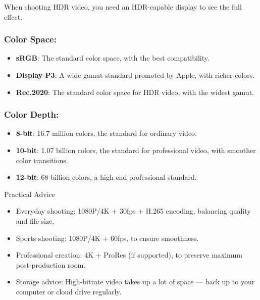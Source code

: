 When shooting HDR video, you need an HDR-capable display to see the full effect.


\subsubsection*{Color Space:}

\begin{itemize}
  \item \textbf{sRGB}: The standard color space, with the best compatibility.
  \item \textbf{Display P3}: A wide-gamut standard promoted by Apple, with richer colors.
  \item \textbf{Rec.2020}: The standard color space for HDR video, with the widest gamut.
\end{itemize}

\subsubsection*{Color Depth:}

\begin{itemize}
  \item \textbf{8-bit}: 16.7 million colors, the standard for ordinary video.
  \item \textbf{10-bit}: 1.07 billion colors, the standard for professional video, with smoother color transitions.
  \item \textbf{12-bit}: 68 billion colors, a high-end professional standard.
\end{itemize}

\begin{tcbinfo}{Practical Advice}
\begin{itemize}
  \item Everyday shooting: 1080P/4K + 30fps + H.265 encoding, balancing quality and file size.
  \item Sports shooting: 1080P/4K + 60fps, to ensure smoothness.
  \item Professional creation: 4K + ProRes (if supported), to preserve maximum post-production room.
  \item Storage advice: High-bitrate video takes up a lot of space — back up to your computer or cloud drive regularly.
\end{itemize}

\end{tcbinfo}

